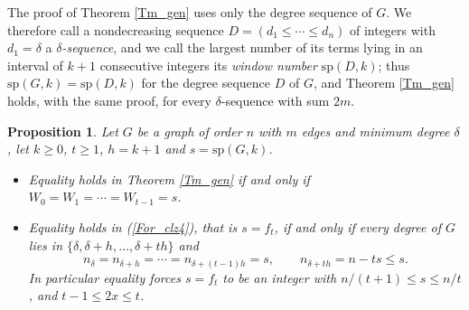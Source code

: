 \documentclass[12pt,a4paper]{article}%
\newtheorem{proposition}[theorem]{Proposition}
\begin{document}


The proof of Theorem \ref{Tm_gen} uses only the degree sequence of $G$. We therefore call a
nondecreasing sequence $D=(d_{1}\leq \cdots \leq d_{n})$ of integers with $d_{1}=\delta $ a
\emph{$\delta $-sequence}, and we call the largest number of its terms lying in an interval of $k+1$
consecutive integers its \emph{window number} $\mathrm{sp}(D,k)$; thus $\mathrm{sp}(G,k)=\mathrm{sp}%
(D,k)$ for the degree sequence $D$ of $G$, and Theorem \ref{Tm_gen} holds, with the same proof, for
every $\delta $-sequence with sum $2m$.

\begin{proposition}
\label{Prop_equality}Let $G$ be a graph of order $n$ with $m$ edges and minimum degree $\delta $, let
$k\geq 0$, $t\geq 1$, $h=k+1$ and $s=\mathrm{sp}(G,k)$.

\begin{itemize}
\item[\textrm{(i)}] Equality holds in Theorem \ref{Tm_gen} if and only if $W_{0}=W_{1}=\cdots
=W_{t-1}=s$.

\item[\textrm{(ii)}] Equality holds in (\ref{For_clz4}), that is $s=f_{t}$, if and only if every
degree of $G$ lies in $\{\delta ,\delta +h,\ldots ,\delta +th\}$ and
\[
n_{\delta }=n_{\delta +h}=\cdots =n_{\delta +(t-1)h}=s,\qquad n_{\delta +th}=n-ts\leq s.
\]
In particular equality forces $s=f_{t}$ to be an integer with $n/(t+1)\leq s\leq n/t$, and
$t-1\leq 2x\leq t$.
\end{itemize}
\end{proposition}
\end{document}
